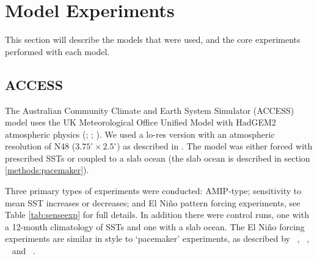 \section{Model Experiments}

This section will describe the models that were used, and the core experiments 
performed with each model.


\subsection{ACCESS}

The Australian Community Climate and Earth System Simulator (ACCESS) model 
\citep{Bi2013} uses the UK Meteorological Office Unified Model with HadGEM2 
atmospheric physics (\citet{Davies2005}; \citet{Martin2010}; 
\citet{Bellouin2011}). We used a lo-res version with an atmospheric resolution 
of N48 ($3.75^{\circ} \times 2.5^{\circ}$) as described in \citet{Frauen2014}.  
The model was either forced with prescribed SSTs or coupled to a slab ocean (the 
slab ocean is described in section \ref{methods:pacemaker}).

Three primary types of experiments were conducted: AMIP-type; sensitivity to 
mean SST increases or decreases; and El Ni{\~n}o pattern forcing experiments, 
see Table \ref{tab:senseexp} for full details. In addition there were control 
runs, one with a 12-month climatology of SSTs and one with a slab ocean.  The El 
Ni{\~n}o forcing experiments are similar in style to `pacemaker' experiments, as 
described by ~\citealt{Alexander1992}, ~\citealt{Alexander1992a}, 
~\citealt{Lau2000} and ~\citealt{Lu2011}. 

